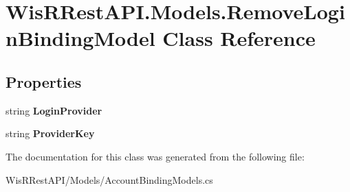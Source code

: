 \hypertarget{class_wis_r_rest_a_p_i_1_1_models_1_1_remove_login_binding_model}{}\section{Wis\+R\+Rest\+A\+P\+I.\+Models.\+Remove\+Login\+Binding\+Model Class Reference}
\label{class_wis_r_rest_a_p_i_1_1_models_1_1_remove_login_binding_model}
\subsection*{Properties}
\begin{DoxyCompactItemize}
\item 
\hypertarget{class_wis_r_rest_a_p_i_1_1_models_1_1_remove_login_binding_model_ac6c87fee967094eb60da5e2156b8d2b2}{}string {\bfseries Login\+Provider}\label{class_wis_r_rest_a_p_i_1_1_models_1_1_remove_login_binding_model_ac6c87fee967094eb60da5e2156b8d2b2}

\item 
\hypertarget{class_wis_r_rest_a_p_i_1_1_models_1_1_remove_login_binding_model_a683fb710a81a2393c0df54d9c2ca9035}{}string {\bfseries Provider\+Key}\label{class_wis_r_rest_a_p_i_1_1_models_1_1_remove_login_binding_model_a683fb710a81a2393c0df54d9c2ca9035}

\end{DoxyCompactItemize}


The documentation for this class was generated from the following file\+:\begin{DoxyCompactItemize}
\item 
Wis\+R\+Rest\+A\+P\+I/\+Models/Account\+Binding\+Models.\+cs\end{DoxyCompactItemize}

